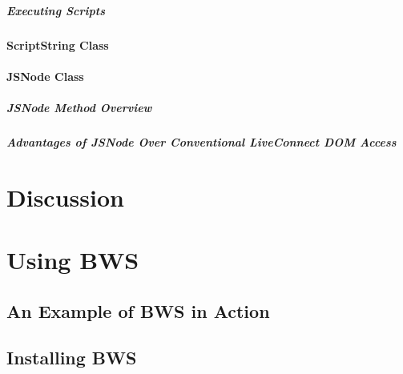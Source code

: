      \paragraph{Executing Scripts}

		  

    \subsubsection{ScriptString Class}
    \label{sec:scriptString}
     
     
    \subsubsection{JSNode Class}
    
     
     
     \paragraph{JSNode Method Overview}
     
      
      
     \paragraph{Advantages of JSNode Over Conventional LiveConnect DOM Access}
     
      
     
\chapter{Discussion}
 \label{sec:discussion}
 

\chapter{Using BWS}
 \label{sec:usingBWS}
 

 \section{An Example of BWS in Action}
 \section{Installing BWS}
 
  
  
